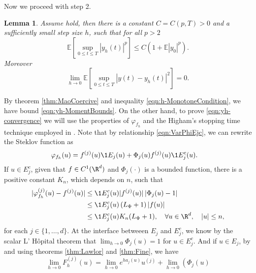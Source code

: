 \documentclass[sort&compress, preprint]{elsarticle}
\theoremstyle{definition}
\theoremstyle{plain}%
\newtheorem{lem}{Lemma}[section]
\theoremstyle{remark}
\newcommand{\m}[1]{\mathbb{E}#1}
\begin{document}
	Now we proceed with step 2. 
\begin{lem}\label{lem:BoundAndConvergenceOfyh}
	Assume  hold, then there is a constant $C=C(p,T)>0$ and a sufficiently small
	step size $h$, such that for all $p>2$
	\begin{equation}\label{eqn:yh-MomentBounds}
		\m\left[
			\sup_{0\leq t \leq T}
				|y_h(t)|^p
		\right]
		\leq
			C
		\left( 
			1+\m |y_0|^p
		\right).
	\end{equation}
	Moreover
	\begin{equation}\label{eqn:yh-convergence}
	\lim_{h \to 0}
	\m\left[
	\sup_{0\leq t \leq T}
	|y(t)-y_h(t)|^2
	\right]=0.
	\end{equation}
\end{lem}
\begin{pf}
	By theorem \ref{thm:MaoCoercive} and inequality \eqref{eqn:h-MonotoneCondition}, 
	we have	 bound \eqref{eqn:yh-MomentBounds}.
	On the other hand, to prove \eqref{eqn:yh-convergence} we will use the properties of 
	$\varphi_{f_h}$ and the Higham's stopping time technique employed in \cite[Thm 2.2]{Higham2002b}. 
	Note that by relationship \eqref{eqn:VarPhiEjc}, we can rewrite the Steklov function  as
	\begin{align}\label{fo}
		\varphi_{f_h}(u) 
			&=  f^{(j)}(u) \1{E_j}(u) +\Phi_j(u) f^{(j)}(u) \1{E_j^c}(u) .
	\end{align}
	 If $u\in E_j^c$, given that  $f \in C^1(\R^d)$ and  
	$\Phi_j(\cdot)$ is a bounded function,
	there is a positive constant $K_n$, which depends on $n$, such that 
	\begin{align*}	
		|\varphi_{f_h}^{(j)}(u) - f^{(j)}(u)|
		&\leq
			\1{E_j^c}(u)
			|f^{(j)}(u)|
			\left|
				\Phi_j(u) - 1
			\right| \notag \\
		&\leq
			\1{E_j^c}(u)
			\left(
				L_{\Phi} + 1
			\right)
			|f(u)|	 \notag \\
		&\leq
		\1{E_j^c}(u) K_n(L_{\Phi}+1), \quad \forall u \in \R^d, \quad |u|\leq n,
	\end{align*}
	for each $j\in \{1,\dots, d\}$. At the interface betweeen $E_j$ and $E_j^c$, 
	we know by the scalar L' H\^{o}pital theorem that 
	$ \lim_{h\to 0} \Phi_j(u) = 1$ for $u\in E_j^c$.
	And if $u\in E_j$,  by  and using   
	theorems \ref{thm:Lawlor} and \ref{thm:Fine}, we have 
	\begin{equation*}
	\lim_{h \to 0} F_h^{(j)}(u)
		=
		\lim_{h \to 0}
			e^{ha_j(u)} u^{(j)} + 
		\lim_{h \to 0}
			\left( \Phi_j(u)

\end{equation*}
\end{pf}
\end{document}
